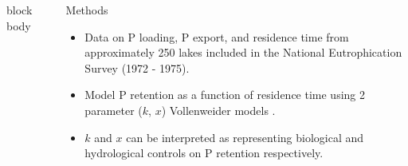 \documentclass[final,hyperref={pdfpagelabels=false}]{beamer}
\begin{document}
\begin{frame}[t]
\begin{columns}[t]
\begin{column}{.465\textwidth}
{\begin{beamercolorbox}[wd=\textwidth,rounded=true]{block body}
\end{beamercolorbox}
}


\end{column} %

\begin{column}{.03\textwidth}\end{column} %
 
\begin{column}{.465\textwidth} %

\begin{block}{Methods}

\begin{itemize}
\item Data on P loading, P export, and residence time from approximately 250 lakes included in the National Eutrophication Survey (1972 - 1975)\cite{StachelekNationalEutrophicationSurvey2017}.
\vspace{1em}
\item Model P retention as a function of residence time using 2 parameter ($k$, $x$) Vollenweider models \cite{Brettreviewreassessmentlake2007}. 
\vspace{1em}
\item $k$ and $x$ can be interpreted as representing biological and hydrological controls on P retention respectively.

\end{itemize}



\end{block}
\end{column}
\end{columns}
\end{frame}
\end{document}
